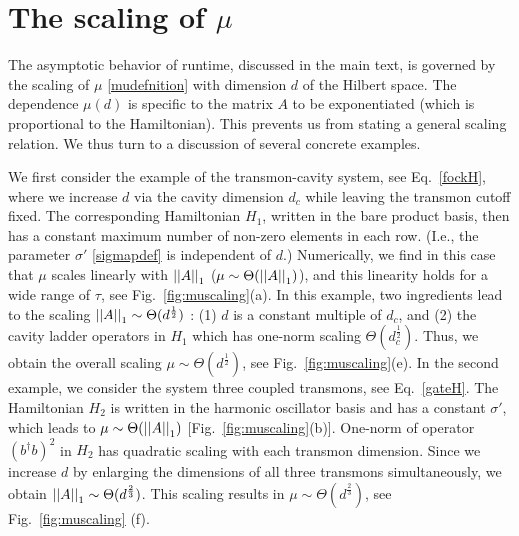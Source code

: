 \section{The scaling of $\mu$}
\label{runtimescalingofUpsi}
The asymptotic behavior of runtime, discussed in the main text, is governed by the scaling of $\mu$ \eqref{mudefnition} with dimension $d$ of the Hilbert space. The dependence $\mu(d)$ is specific to the matrix $A$ to be exponentiated (which is proportional to the Hamiltonian). This prevents us from stating a general scaling relation. We thus turn to a discussion of several concrete examples. 

We first consider the example of the transmon-cavity system, see Eq.\ \eqref{fockH}, where we increase $d$ via the cavity dimension $d_c$ while leaving the transmon cutoff fixed. The corresponding Hamiltonian $H_1$, written in the bare product basis, then has a constant maximum number of non-zero elements in each row. (I.e., the parameter $\sigma'$ \eqref{sigmapdef} is independent of $d$.) Numerically, we find in this case that $\mu$ scales linearly with $\left|\left|A\right|\right|_1$ \big($\mu\sim\Theta(\left|\left|A\right|\right|_1)$\big), and this linearity holds for a wide range of $\tau$, see Fig.\ \ref{fig:muscaling}(a). In this example, two ingredients lead to the scaling $\left|\left|A\right|\right|_1\sim \Theta(d^{\frac{1}{2}})$ : (1) $d$ is a constant multiple of $d_c$, and (2) the cavity ladder operators in $H_1$ which has one-norm scaling $\Theta(d_c^\frac{1}{2})$. Thus, we obtain the overall scaling $\mu\sim \Theta(d^{\frac{1}{2}})$, see Fig.\ \ref{fig:muscaling}(e). In the second example, we consider the system three coupled transmons, see Eq.\ \eqref{gateH}. The Hamiltonian $H_2$ is written in the harmonic oscillator basis and has a constant $\sigma'$, which leads to $\mu\sim\Theta(\left|\left|A\right|\right|_1)$ [Fig.\ \ref{fig:muscaling}(b)]. One-norm of operator $(b^\dagger b)^2$ in $H_2$ has quadratic scaling with each transmon dimension. Since we increase $d$ by enlarging the dimensions of all three transmons simultaneously, we obtain $\left|\left|A\right|\right|_1\sim\Theta(d^{\frac{2}{3}})$. This scaling results in $\mu\sim \Theta(d^{\frac{2}{3}})$, see Fig.\ \ref{fig:muscaling} (f).

